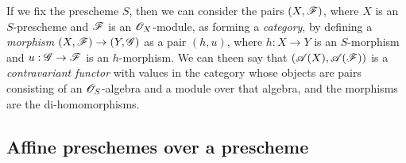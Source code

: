 \begin{env}[1.1.3]
\label{2.1.1.3}
If we fix the prescheme $S$, then we can consider the pairs $(X,\mathscr{F})$, where $X$ is an $S$-prescheme and $\mathscr{F}$ is an $\mathscr{O}_X$-module, as forming a \emph{category}, by defining a \emph{morphism} $(X,\sh{F})\to(Y,\sh{G})$ as a pair $(h,u)$, where $h:X\to Y$ is an $S$-morphism and $u:\sh{G}\to\sh{F}$ is an $h$-morphism.
We can theen say that $(\mathscr{A}(X),\mathscr{A}(\mathscr{F}))$ is a \emph{contravariant functor} with values in the category whose objects are pairs consisting of an $\mathscr{O}_S$-algebra and a module over that algebra, and the morphisms are the di-homomorphisms.
\end{env}

\subsection{Affine preschemes over a prescheme}
\label{subsection-affine-preschemes-over-a-prescheme}

